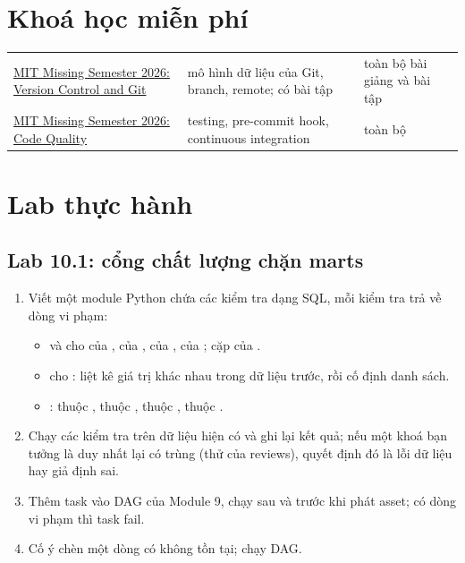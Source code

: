 \section{Khoá học miễn phí}
\begin{xltabular}{\textwidth}{@{}P{4.2cm} L P{2.6cm}@{}}
\toprule
{} &  &  \\
\midrule
\endhead
\bottomrule
\endfoot
\href{https://missing.csail.mit.edu/2026/version-control/}{MIT Missing Semester 2026: Version Control and Git} & mô hình dữ liệu của Git, branch, remote; có bài tập & toàn bộ bài giảng và bài tập \\
\href{https://missing.csail.mit.edu/2026/code-quality/}{MIT Missing Semester 2026: Code Quality} & testing, pre-commit hook, continuous integration & toàn bộ \\
\end{xltabular}

\section{Lab thực hành}

\subsection{Lab 10.1: cổng chất lượng chặn marts}
\begin{enumerate}
  \item Viết một module Python chứa các kiểm tra dạng SQL, mỗi kiểm tra trả về dòng vi phạm:
  \begin{itemize}
    \item {} và  cho  của ,  của ,  của ,  của ; cặp  của .
    \item {} cho : liệt kê giá trị khác nhau trong dữ liệu trước, rồi cố định danh sách.
    \item {}:  thuộc ,  thuộc ,  thuộc ,  thuộc .
  \end{itemize}
  \item Chạy các kiểm tra trên dữ liệu hiện có và ghi lại kết quả; nếu một khoá bạn tưởng là duy nhất lại có trùng (thử  của reviews), quyết định đó là lỗi dữ liệu hay giả định sai.
  \item Thêm task  vào DAG  của Module 9, chạy sau  và trước khi phát asset; có dòng vi phạm thì task fail.
  \item Cố ý chèn một dòng  có  không tồn tại; chạy DAG.
\end{enumerate}

